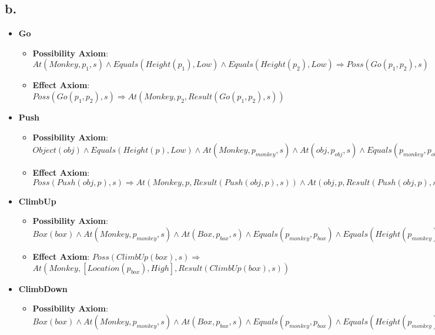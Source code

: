 \documentclass{article}
\begin{document}
        \subsection{b.}
            \begin{itemize}
                \item \textbf{Go}
                    \begin{itemize}
                        \item \textbf{Possibility Axiom}: $At(Monkey, p_1, s)\land Equals(Height(p_1), Low)\land Equals(Height(p_2), Low)\Rightarrow Poss(Go(p_1, p_2), s)$
                        \item \textbf{Effect Axiom}: $Poss(Go(p_1, p_2), s)\Rightarrow At(Monkey, p_2, Result(Go(p_1, p_2), s))$
                    \end{itemize}
                \item \textbf{Push}
                    \begin{itemize}
                        \item \textbf{Possibility Axiom}: $Object(obj)\land Equals(Height(p), Low)\land At(Monkey,p_{monkey}, s)\land At(obj, p_{obj}, s)\land Equals(p_{monkey}, p_{obj})\land Equals(Height(p_{monkey}), Low) \Rightarrow Poss(Push(obj, p), s)$
                        \item \textbf{Effect Axiom}: $Poss(Push(obj, p), s)\Rightarrow At(Monkey, p, Result(Push(obj, p), s)) \land At(obj, p, Result(Push(obj, p), s))$
                    \end{itemize}
                \item \textbf{ClimbUp}
                    \begin{itemize}
                        \item \textbf{Possibility Axiom}: $Box(box)\land At(Monkey, p_{monkey}, s)\land At(Box, p_{box}, s)\land Equals(p_{monkey}, p_{box})\land Equals(Height(p_{monkey}), Low)\Rightarrow Poss(ClimbUp(box), s)$
                        \item \textbf{Effect Axiom}: $Poss(ClimbUp(box), s)\Rightarrow$\\
                            $At(Monkey, [Location(p_{box}), High], Result(ClimbUp(box), s))$
                    \end{itemize}
                \item \textbf{ClimbDown}
                    \begin{itemize}
                        \item \textbf{Possibility Axiom}: $Box(box)\land At(Monkey, p_{monkey}, s)\land At(Box, p_{box}, s)\land Equals(p_{monkey}, p_{box})\land Equals(Height(p_{monkey}), High)\Rightarrow Poss(ClimbDown(box), s)$

\end{itemize}
\end{itemize}
\end{document}
